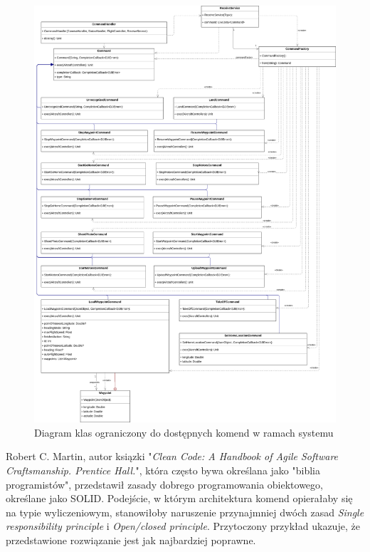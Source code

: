 \begin{figure}[!htbp]
\begin{center}
  \includegraphics[width=16cm]{./Obrazy/commands.png}
  \caption{Diagram klas ograniczony do dostępnych komend w ramach systemu}
\end{center}
\end{figure}

Robert C. Martin, autor ksiązki "\textit{Clean Code: A Handbook of Agile Software Craftsmanship. Prentice Hall.}", która często bywa określana jako "biblia programistów", przedstawił zasady dobrego programowania obiektowego, określane jako SOLID. Podejście, w którym architektura komend opierałaby się na typie wyliczeniowym, stanowiłoby naruszenie przynajmniej dwóch zasad \textit{Single responsibility principle} i \textit{Open/closed principle}. Przytoczony przykład ukazuje, że przedstawione rozwiązanie jest jak najbardziej poprawne.\cite{solid}\cite{clean-code}


